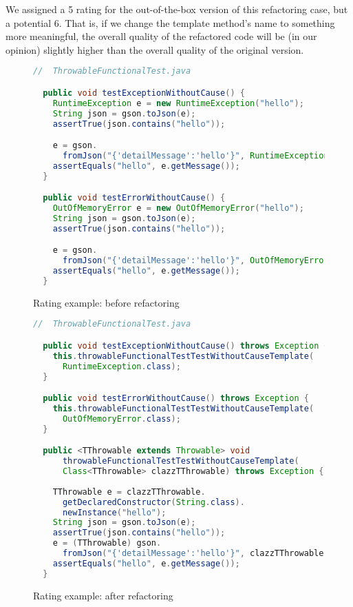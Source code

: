 We assigned a 5 rating for the out-of-the-box version of this refactoring case, but a potential 6. That is, if we change the template method's name to something more meaningful, the overall quality of the refactored code will be (in our opinion) slightly higher than the overall quality of the original version.

\begin{figure}
\begin{lstlisting}[language=Java]
  //  ThrowableFunctionalTest.java

  public void testExceptionWithoutCause() {
    RuntimeException e = new RuntimeException("hello");
    String json = gson.toJson(e);
    assertTrue(json.contains("hello"));

    e = gson.
      fromJson("{'detailMessage':'hello'}", RuntimeException.class);
    assertEquals("hello", e.getMessage());
  }

  public void testErrorWithoutCause() {
    OutOfMemoryError e = new OutOfMemoryError("hello");
    String json = gson.toJson(e);
    assertTrue(json.contains("hello"));

    e = gson.
      fromJson("{'detailMessage':'hello'}", OutOfMemoryError.class);
    assertEquals("hello", e.getMessage());
  }
\end{lstlisting}
\caption{Rating example: before refactoring}
\label{figure:rating-before}
\end{figure}

\begin{figure}
\begin{lstlisting}[language=Java]
  //  ThrowableFunctionalTest.java

  public void testExceptionWithoutCause() throws Exception {
    this.throwableFunctionalTestTestWithoutCauseTemplate(
      RuntimeException.class);
  }

  public void testErrorWithoutCause() throws Exception {
    this.throwableFunctionalTestTestWithoutCauseTemplate(
      OutOfMemoryError.class);
  }

  public <TThrowable extends Throwable> void
      throwableFunctionalTestTestWithoutCauseTemplate(
      Class<TThrowable> clazzTThrowable) throws Exception {
      
    TThrowable e = clazzTThrowable.
      getDeclaredConstructor(String.class).
      newInstance("hello");
    String json = gson.toJson(e);
    assertTrue(json.contains("hello"));
    e = (TThrowable) gson.
      fromJson("{'detailMessage':'hello'}", clazzTThrowable);
    assertEquals("hello", e.getMessage());
  }
\end{lstlisting}
\caption{Rating example: after refactoring}
\label{figure:rating-after}
\end{figure}

